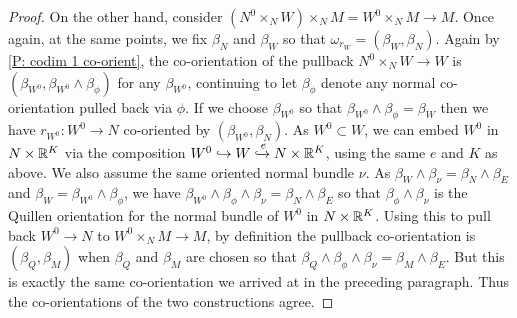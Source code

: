 \begin{proof}
	On the other hand, consider $(N^0 \times_N W) \times_N M = W^0 \times_N M \to M$.
	Once again, at the same points, we fix $\beta_N$ and $\beta_W$ so that $\omega_{r_W} = (\beta_W,\beta_N)$.
	Again by \cref{P: codim 1 co-orient}, the co-orientation of the pullback $N^0 \times_N W \to W$ is $(\beta_{W^0},\beta_{W^0} \wedge \beta_\phi)$ for any $\beta_{W^0}$, continuing to let $\beta_\phi$ denote any normal co-orientation pulled back via $\phi$.
	If we choose $\beta_{W^0}$ so that $\beta_{W^0} \wedge \beta_\phi = \beta_W$ then we have $r_{W^0} \colon W^0 \to N$ co-oriented by $(\beta_{W^0},\beta_N)$.
	As $W^0 \subset W$, we can embed $W^0$ in $N \times \mathbb{R}^K$ via the composition $W^0 \hookrightarrow W \xhookrightarrow{e}N \times \mathbb{R}^K$, using the same $e$ and $K$ as above.
	We also assume the same oriented normal bundle $\nu$.
	As $\beta_W \wedge \beta_\nu = \beta_N \wedge \beta_E$ and $\beta_W = \beta_{W^0} \wedge \beta_\phi$, we have $\beta_{W^0} \wedge \beta_\phi \wedge \beta_\nu = \beta_N \wedge \beta_E$ so that $\beta_\phi \wedge \beta_\nu$ is the Quillen orientation for the normal bundle of $W^0$ in $N \times \mathbb{R}^K$.
	Using this to pull back $W^0 \to N$ to $W^0 \times_N M \to M$, by definition the pullback co-orientation is $(\beta_Q,\beta_M)$ when $\beta_Q$ and $\beta_M$ are chosen so that $\beta_Q \wedge \beta_\phi \wedge \beta_\nu = \beta_M \wedge \beta_E$.
	But this is exactly the same co-orientation we arrived at in the preceding paragraph.
	Thus the co-orientations of the two constructions agree.
\end{proof}

